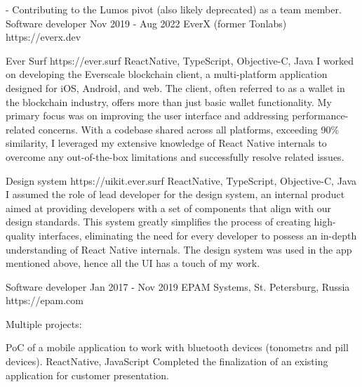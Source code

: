 \documentclass[11pt,a4paper,sans]{awesomecv}
\begin{document}
\begin{cventries}
{{          - Contributing to the Lumos pivot (also likely deprecated) as a team member.
          \hfill \break
        }
    }
\cventry
    {Software developer}
    {Nov 2019 - Aug 2022}
    {EverX (former Tonlabs)}
    {https://everx.dev}
    {
      \begin{cvprojects}{0.8ex}
      \item \cvproject
        {Ever Surf}
        {https://ever.surf}{}
        {ReactNative, TypeScript, Objective-C, Java}
        {
          I worked on developing the Everscale blockchain client, 
          a multi-platform application designed for iOS, Android, and web. 
          The client, often referred to as a wallet in the blockchain industry, 
          offers more than just basic wallet functionality. 
          My primary focus was on improving the user interface and addressing 
          performance-related concerns. With a codebase shared across all platforms, 
          exceeding 90\% similarity, I leveraged my extensive knowledge of React Native 
          internals to overcome any out-of-the-box limitations and successfully resolve related issues.
        }
      \item \cvproject
        {Design system}
        {https://uikit.ever.surf}{}
        {ReactNative, TypeScript, Objective-C, Java}
        {
          I assumed the role of lead developer for the design system, 
          an internal product aimed at providing developers with a set of 
          components that align with our design standards. 
          This system greatly simplifies the process of creating high-quality interfaces, 
          eliminating the need for every developer to possess an in-depth understanding of React Native internals.
          \hfill \break
          \hfill \break
          The design system was used in the app mentioned above, hence all the UI has a touch of my work.
        }
    \end{cvprojects}
    }
\cventry
    {Software developer}
    {Jan 2017 - Nov 2019}
    {EPAM Systems, St. Petersburg, Russia}
    {https://epam.com}
    {
      Multiple projects:\newline
      \begin{cvprojects}{0.8ex}
      \item \cvproject
          {PoC of a mobile application to work with bluetooth devices (tonometrs and pill devices).}
          {}{}
          {ReactNative, JavaScript}
          {Completed the finalization of an existing application for customer presentation.}
      \item \cvproject

\end{cvprojects}}
\end{cventries}
\end{document}
